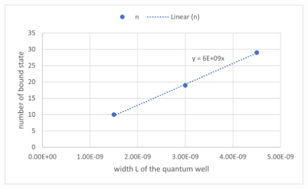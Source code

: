 \documentclass[11pt]{book}
\theoremstyle{break}
\theoremstyle{break}
\begin{document}
\begin{center}
\includegraphics[scale=1.19]{2}
\end{center}
\end{document}
